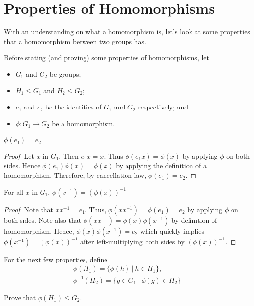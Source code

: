 \section{Properties of Homomorphisms}
With an understanding on what a homomorphism is, let's look at some properties that a homomorphism between two groups has.

Before stating (and proving) some properties of homomorphisms, let
\begin{itemize}
    \item $G_1$ and $G_2$ be groups;
    \item $H_1 \leq G_1$ and $H_2 \leq G_2$;
    \item $e_1$ and $e_2$ be the identities of $G_1$ and $G_2$ respectively; and
    \item $\phi: G_1 \to G_2$ be a homomorphism.
\end{itemize}

\begin{proposition}
    $\phi(e_1) = e_2$
\end{proposition}
\begin{proof}
    Let $x$ in $G_1$. Then $e_1x = x$. Thus $\phi(e_1x) = \phi(x)$ by applying $\phi$ on both sides. Hence $\phi(e_1)\phi(x) = \phi(x)$ by applying the definition of a homomorphism. Therefore, by cancellation law, $\phi(e_1) = e_2$.
\end{proof}

\newpage

\begin{proposition}
    For all $x$ in $G_1$, $\phi(x^{-1}) = \left(\phi(x)\right)^{-1}$.
\end{proposition}
\begin{proof}
    Note that $xx^{-1} = e_1$. Thus, $\phi(xx^{-1}) = \phi(e_1) = e_2$ by applying $\phi$ on both sides. Note also that $\phi(xx^{-1}) = \phi(x)\phi(x^{-1})$ by definition of homomorphism. Hence, $\phi(x)\phi(x^{-1}) = e_2$ which quickly implies $\phi(x^{-1}) = \left(\phi(x)\right)^{-1}$ after left-multiplying both sides by $\left(\phi(x)\right)^{-1}$.
\end{proof}

For the next few properties, define
\begin{gather*}
    \phi(H_1) = \{\phi(h) \ | \ h \in H_1\},\\
    \phi^{-1}(H_2) = \{g \in G_1 \ | \ \phi(g) \in H_2\}
\end{gather*}

\begin{exercise}
    Prove that $\phi(H_1) \leq G_2$.
\end{exercise}



